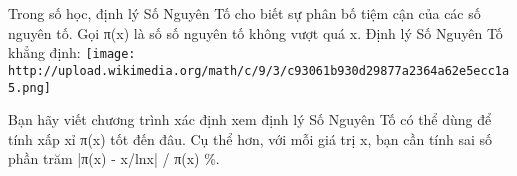 Trong số học, định lý Số Nguyên Tố cho biết sự phân bố tiệm cận của các số nguyên tố. Gọi π(x) là số số nguyên tố không vượt quá x. Định lý Số Nguyên Tố khẳng định:  
\texttt{[image: http://upload.wikimedia.org/math/c/9/3/c93061b930d29877a2364a62e5ecc1a5.png]}

   Bạn hãy viết chương trình xác định xem định lý Số Nguyên Tố có thể dùng để tính xấp xỉ π(x) tốt đến đâu. Cụ thể hơn, với mỗi giá trị x, bạn cần tính sai số phần trăm |π(x) - x/lnx| / π(x) \%.  

\